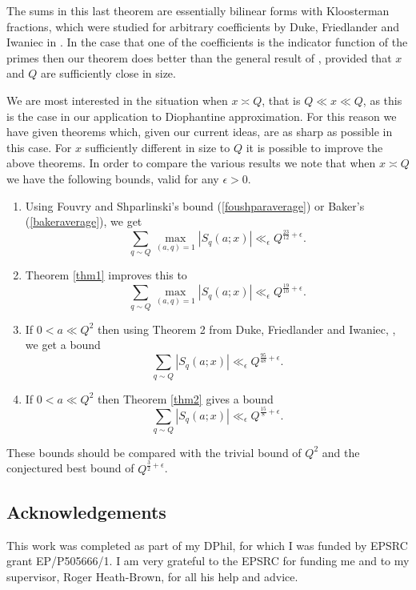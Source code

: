 \documentclass[12pt]{article}
\begin{document}
The sums in this last theorem are essentially bilinear forms with Kloosterman fractions, which were studied for arbitrary coefficients by Duke, Friedlander and Iwaniec in \cite{dfi}.  In the case that one of the coefficients is the indicator function of the primes then our theorem does better than the general result of \cite{dfi}, provided that  $x$ and $Q$ are sufficiently close in size.

We are most interested in the situation when $x\asymp Q$, that is
$Q\ll x\ll Q$, as this is the case in our application to Diophantine
approximation.  For this reason we have given theorems which, given
our current ideas, are as sharp as possible in this case.  For $x$
sufficiently different in size to $Q$ it is possible to improve the
above theorems.  In order to compare the various
results we note
that when $x\asymp Q$ we have the following bounds, valid for any
$\epsilon>0$. 

\begin{enumerate}
\item Using Fouvry and Shparlinski's bound (\ref{foushparaverage}) or Baker's  (\ref{bakeraverage}), we get  
$$\sum_{q\sim Q}\max_{(a,q)=1}|S_q(a;x)|\ll_\epsilon Q^{\frac{23}{12}+\epsilon}.$$

\item Theorem \ref{thm1} improves this to 
$$\sum_{q\sim Q}\max_{(a,q)=1}|S_q(a;x)|\ll_\epsilon Q^{\frac{19}{10}+\epsilon}.$$

\item If $0<a\ll Q^2$ then using Theorem 2 from Duke, Friedlander and Iwaniec, \cite{dfi}, we get a bound 
$$\sum_{q\sim Q}|S_q(a;x)|\ll_\epsilon Q^{\frac{95}{48}+\epsilon}.$$

\item If $0<a\ll Q^2$ then Theorem \ref{thm2} gives a bound 
$$\sum_{q\sim Q}|S_q(a;x)|\ll_\epsilon Q^{\frac{15}{8}+\epsilon}.$$
\end{enumerate}

These bounds should be compared with  the trivial bound of  $Q^2$ and the conjectured best bound of $Q^{\frac32+\epsilon}$.

\subsection*{Acknowledgements}

This work was completed as part of my DPhil, for which I was funded by EPSRC grant EP/P505666/1. I am very grateful to the
EPSRC for funding me and to my supervisor, Roger Heath-Brown, for all
his help and advice. 
\end{document}
